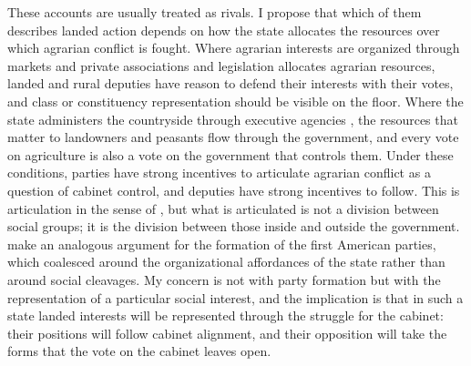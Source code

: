 \documentclass[12pt]{article}
\begin{document}
These accounts are usually treated as rivals. I propose that which of them describes landed action depends on how the state allocates the resources over which agrarian conflict is fought. Where agrarian interests are organized through markets and private associations and legislation allocates agrarian resources, landed and rural deputies have reason to defend their interests with their votes, and class or constituency representation should be visible on the floor. Where the state administers the countryside through executive agencies \citep{mann1984,heper1985,keyder1987}, the resources that matter to landowners and peasants flow through the government, and every vote on agriculture is also a vote on the government that controls them. Under these conditions, parties have strong incentives to articulate agrarian conflict as a question of cabinet control, and deputies have strong incentives to follow. This is articulation in the sense of \citet{deleon2009}, but what is articulated is not a division between social groups; it is the division between those inside and outside the government. \citet{rohr2025} make an analogous argument for the formation of the first American parties, which coalesced around the organizational affordances of the state rather than around social cleavages. My concern is not with party formation but with the representation of a particular social interest, and the implication is that in such a state landed interests will be represented through the struggle for the cabinet: their positions will follow cabinet alignment, and their opposition will take the forms that the vote on the cabinet leaves open.
\end{document}
